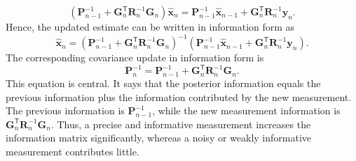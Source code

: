 \documentclass[graybox,envcountchap]{style/SNmono}
\begin{document}
\begin{equation*}
\left(\mathbf{P}_{n-1}^{-1}+\mathbf{G}_n^{\mathsf T}\mathbf{R}_n^{-1}\mathbf{G}_n\right)\widehat{\mathbf{x}}_n = \mathbf{P}_{n-1}^{-1}\widehat{\mathbf{x}}_{n-1} +\mathbf{G}_n^{\mathsf T}\mathbf{R}_n^{-1}\mathbf{y}_n.
\end{equation*}
Hence, the updated estimate can be written in information form as
\begin{equation}
\widehat{\mathbf{x}}_n = \left( \mathbf{P}_{n-1}^{-1} + \mathbf{G}_n^{\mathsf T} \mathbf{R}_n^{-1} \mathbf{G}_n \right)^{-1} \left( \mathbf{P}_{n-1}^{-1} \widehat{\mathbf{x}}_{n-1} + \mathbf{G}_n^{\mathsf T} \mathbf{R}_n^{-1} \mathbf{y}_n \right).
\end{equation}
The corresponding covariance update in information form is
\begin{equation}
\mathbf{P}_n^{-1}
=
\mathbf{P}_{n-1}^{-1}
+
\mathbf{G}_n^{\mathsf T}
\mathbf{R}_n^{-1}
\mathbf{G}_n.
\end{equation}
This equation is central. It says that the posterior information equals the previous information plus the information contributed by the new measurement. The previous information is $\mathbf{P}_{n-1}^{-1}$, while the new measurement information is $\mathbf{G}_n^{\mathsf T}\mathbf{R}_n^{-1}\mathbf{G}_n$. Thus, a precise and informative measurement increases the information matrix significantly, whereas a noisy or weakly informative measurement contributes little.
\end{document}
